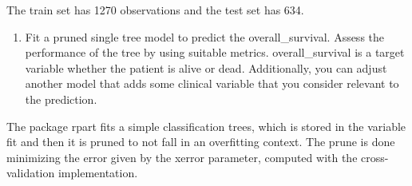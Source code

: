 \documentclass[
]{article}
\newenvironment{Shaded}{\begin{snugshade}}{\end{snugshade}}
\newcommand{\DataTypeTok}[1]{\textcolor[rgb]{0.13,0.29,0.53}{#1}}
\newcommand{\KeywordTok}[1]{\textcolor[rgb]{0.13,0.29,0.53}{\textbf{#1}}}
\newcommand{\NormalTok}[1]{#1}
\newcommand{\OperatorTok}[1]{\textcolor[rgb]{0.81,0.36,0.00}{\textbf{#1}}}
\newcommand{\StringTok}[1]{\textcolor[rgb]{0.31,0.60,0.02}{#1}}
\providecommand{\tightlist}{%
  \setlength{\itemsep}{0pt}\setlength{\parskip}{0pt}}
\begin{document}
\begin{Shaded}
\end{Shaded}

The train set has 1270 observations and the test set has 634.

\begin{enumerate}
\def\labelenumi{\arabic{enumi}.}
\setcounter{enumi}{2}
\tightlist
\item
  Fit a pruned single tree model to predict the overall\_survival.
  Assess the performance of the tree by using suitable metrics.
  overall\_survival is a target variable whether the patient is alive or
  dead. Additionally, you can adjust another model that adds some
  clinical variable that you consider relevant to the prediction.
\end{enumerate}

\begin{Shaded}
\end{Shaded}

The package rpart fits a simple classification trees, which is stored in
the variable fit and then it is pruned to not fall in an overfitting
context. The prune is done minimizing the error given by the xerror
parameter, computed with the cross-validation implementation.
\end{document}
